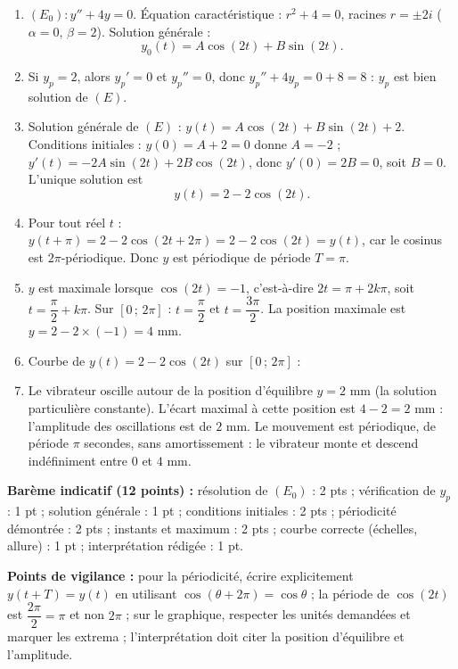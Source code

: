 \documentclass[11pt]{article}
\newcommand{\cle}[1]{{\popxbold\color{popdark}#1}}
\newcommand{\legende}[1]{\par\vspace{6pt}{\popsemi\fontsize{9}{11.5}\selectfont\color{popmuted}#1}}
\begin{document}
\begin{corrige}
\begin{enumerate}
\item $(E_0) : y'' + 4y = 0$. Équation caractéristique : $r^2 + 4 = 0$, racines $r = \pm 2i$ ($\alpha = 0$, $\beta = 2$). Solution générale :
\[ y_0(t) = A\cos(2t) + B\sin(2t). \]
\item Si $y_p = 2$, alors $y_p' = 0$ et $y_p'' = 0$, donc $y_p'' + 4y_p = 0 + 8 = 8$ : $y_p$ est bien solution de $(E)$.
\item Solution générale de $(E)$ : $y(t) = A\cos(2t) + B\sin(2t) + 2$. Conditions initiales : $y(0) = A + 2 = 0$ donne $A = -2$ ; $y'(t) = -2A\sin(2t) + 2B\cos(2t)$, donc $y'(0) = 2B = 0$, soit $B = 0$. L'unique solution est
\[ y(t) = 2 - 2\cos(2t). \]
\item Pour tout réel $t$ : $y(t + \pi) = 2 - 2\cos(2t + 2\pi) = 2 - 2\cos(2t) = y(t)$, car le cosinus est $2\pi$-périodique. Donc $y$ est \cle{périodique} de période $T = \pi$.
\item $y$ est maximale lorsque $\cos(2t) = -1$, c'est-à-dire $2t = \pi + 2k\pi$, soit $t = \dfrac{\pi}{2} + k\pi$. Sur $[0\,;\,2\pi]$ : $t = \dfrac{\pi}{2}$ et $t = \dfrac{3\pi}{2}$. La position maximale est $y = 2 - 2 \times (-1) = 4$ mm.
\item Courbe de $y(t) = 2 - 2\cos(2t)$ sur $[0\,;\,2\pi]$ :
\begin{popfigure}
\legende{Courbe de $y(t) = 2 - 2\cos(2t)$ sur $[0\,;\,2\pi]$ : deux périodes complètes.}
\end{popfigure}
\item Le vibrateur oscille autour de la position d'équilibre $y = 2$ mm (la solution particulière constante). L'écart maximal à cette position est $4 - 2 = 2$ mm : l'\cle{amplitude} des oscillations est de $2$ mm. Le mouvement est périodique, de période $\pi$ secondes, sans amortissement : le vibrateur monte et descend indéfiniment entre $0$ et $4$ mm.
\end{enumerate}
\textbf{Barème indicatif (12 points) :} résolution de $(E_0)$ : 2 pts ; vérification de $y_p$ : 1 pt ; solution générale : 1 pt ; conditions initiales : 2 pts ; périodicité démontrée : 2 pts ; instants et maximum : 2 pts ; courbe correcte (échelles, allure) : 1 pt ; interprétation rédigée : 1 pt.

\textbf{Points de vigilance :} pour la périodicité, écrire explicitement $y(t + T) = y(t)$ en utilisant $\cos(\theta + 2\pi) = \cos\theta$ ; la période de $\cos(2t)$ est $\dfrac{2\pi}{2} = \pi$ et non $2\pi$ ; sur le graphique, respecter les unités demandées et marquer les extrema ; l'interprétation doit citer la position d'équilibre et l'amplitude.
\end{corrige}
\end{document}
